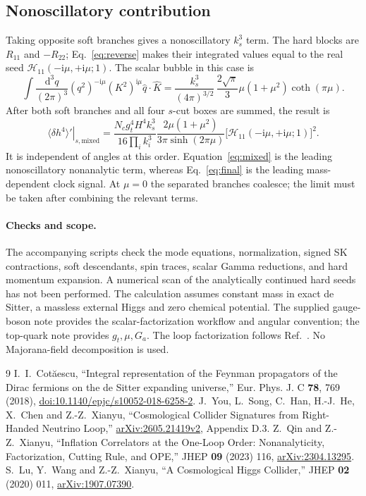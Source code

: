 \documentclass[a4paper,12pt]{article}
\newcommand{\ii}{\mathrm i}
\newcommand{\dd}{\mathrm d}
\begin{document}
\subsection{Nonoscillatory contribution}
Taking opposite soft branches gives a nonoscillatory $k_s^3$ term. The hard
blocks are $R_{11}$ and $-R_{22}$; Eq.~\eqref{eq:reverse} makes their integrated
values equal to the real seed $\mathcal H_{11}(-\ii\mu,+\ii\mu;1)$.
The scalar bubble in this case is
\begin{equation}
 \int\frac{\dd^3q}{(2\pi)^3}(q^2)^{-\ii\mu}(K^2)^{\ii\mu}
 \hat q\cdot\hat K
 =\frac{k_s^3}{(4\pi)^{3/2}}\,
 \frac{2\sqrt\pi}{3}\mu(1+\mu^2)\coth(\pi\mu).
\end{equation}
After both soft branches and all four $s$-cut boxes are summed, the result is
\begin{equation}
 \left.\langle\delta h^4\rangle'\right|_{s,\mathrm{mixed}}
 =\frac{N_cg_t^4H^4 k_s^3}{16\prod_i k_i^3}
 \frac{2\mu(1+\mu^2)}{3\pi\sinh(2\pi\mu)}
 \big[\mathcal H_{11}(-\ii\mu,+\ii\mu;1)\big]^2.
 \label{eq:mixed}
\end{equation}
It is independent of angles at this order. Equation~\eqref{eq:mixed} is the
leading nonoscillatory nonanalytic term, whereas Eq.~\eqref{eq:final} is the
leading mass-dependent clock signal. At $\mu=0$ the separated branches coalesce;
the limit must be taken after combining the relevant terms.

\paragraph{Checks and scope.}
The accompanying scripts check the mode equations, normalization, signed SK
contractions, soft descendants, spin traces, scalar Gamma reductions, and hard
momentum expansion. A numerical scan of the analytically continued hard seeds
has not been performed. The calculation assumes constant mass in exact de Sitter,
a massless external Higgs and zero chemical potential. The supplied gauge-boson
note provides the scalar-factorization workflow and angular convention; the
top-quark note provides $g_t,\mu,G_a$. The loop factorization follows
Ref.~\cite{qin}. No Majorana-field decomposition is used.

\begin{thebibliography}{9}
 I.~I.~Cot\u aescu, ``Integral representation of the Feynman propagators of
the Dirac fermions on the de Sitter expanding universe,'' Eur. Phys. J. C
\textbf{78}, 769 (2018),
\href{https://doi.org/10.1140/epjc/s10052-018-6258-2}{doi:10.1140/epjc/s10052-018-6258-2}.
 J.~You, L.~Song, C.~Han, H.-J.~He, X.~Chen and Z.-Z.~Xianyu,
``Cosmological Collider Signatures from Right-Handed Neutrino Loop,''
\href{https://arxiv.org/abs/2605.21419v2}{arXiv:2605.21419v2}, Appendix D.3.
 Z.~Qin and Z.-Z.~Xianyu, ``Inflation Correlators at the One-Loop Order:
Nonanalyticity, Factorization, Cutting Rule, and OPE,'' JHEP \textbf{09} (2023) 116,
\href{https://arxiv.org/abs/2304.13295}{arXiv:2304.13295}.
 S.~Lu, Y.~Wang and Z.-Z.~Xianyu, ``A Cosmological Higgs Collider,''
JHEP \textbf{02} (2020) 011,
\href{https://arxiv.org/abs/1907.07390}{arXiv:1907.07390}.
\end{thebibliography}
\end{document}
